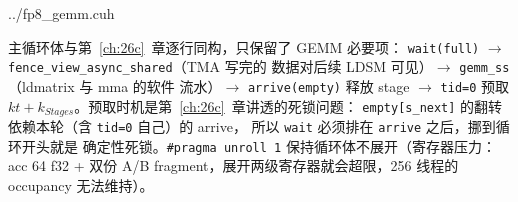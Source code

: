 \begin{lstinputlisting}[linerange={516-543},firstnumber=auto,
  title={fp8\_gemm.cuh L516-543（主循环：wait full $\to$ gemm\_ss $\to$ arrive empty $\to$ 预取）}]{../fp8_gemm.cuh}
\end{lstinputlisting}

主循环体与第~\ref{ch:26c}~章逐行同构，只保留了 GEMM 必要项：
\texttt{wait(full)} $\to$ \texttt{fence\_view\_async\_shared}（TMA 写完的
数据对后续 LDSM 可见）$\to$ \texttt{gemm\_ss}（ldmatrix 与 mma 的软件
流水）$\to$ \texttt{arrive(empty)} 释放 stage $\to$ \texttt{tid=0} 预取
$kt{+}k_{Stages}$。预取时机是第~\ref{ch:26c}~章讲透的死锁问题：
\texttt{empty[s\_next]} 的翻转依赖本轮（含 \texttt{tid=0} 自己）的 arrive，
所以 \texttt{wait} 必须排在 \texttt{arrive} 之后，挪到循环开头就是
确定性死锁。\texttt{\#pragma unroll 1} 保持循环体不展开（寄存器压力：
acc 64 f32 + 双份 A/B fragment，展开两级寄存器就会超限，256 线程的 occupancy 无法维持）。

